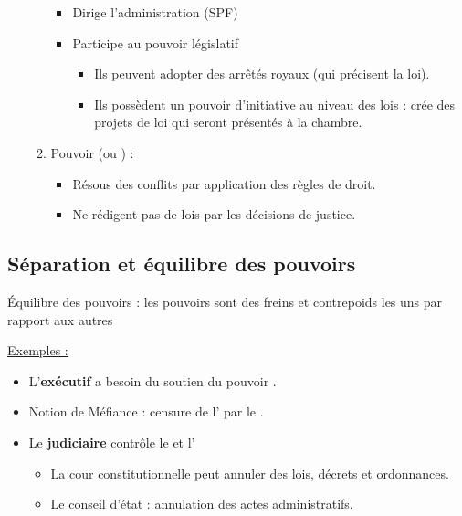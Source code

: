 \begin{itemize}
\begin{enumerate}
\begin{itemize}
            \item Dirige l'administration (SPF)
            \item Participe au pouvoir législatif
            \begin{itemize}
                \item Ils peuvent adopter des arrêtés royaux (qui précisent la loi).
                \item Ils possèdent un pouvoir d'initiative au niveau des lois : crée des projets de loi qui seront présentés à la chambre.
            \end{itemize}
        \end{itemize}
        \item Pouvoir  (ou ) :
        \begin{itemize}
            \item Résous des conflits par application des règles de droit.
            \item Ne rédigent pas de lois par les décisions de justice.
        \end{itemize}
    \end{enumerate}
\end{itemize}

\subsection{Séparation et équilibre des pouvoirs}

Équilibre des pouvoirs : les pouvoirs sont des freins et contrepoids les uns par rapport aux autres

\underline{Exemples :}
\begin{itemize}
    \item L'\textbf{exécutif} a besoin du soutien du pouvoir .
    \item Notion de Méfiance : censure de l' par le .
    \item Le \textbf{judiciaire} contrôle le  et l'
    \begin{itemize}
        \item La cour constitutionnelle peut annuler des lois, décrets et ordonnances.
        \item Le conseil d'état : annulation des actes administratifs.
    \end{itemize}
\end{itemize}

